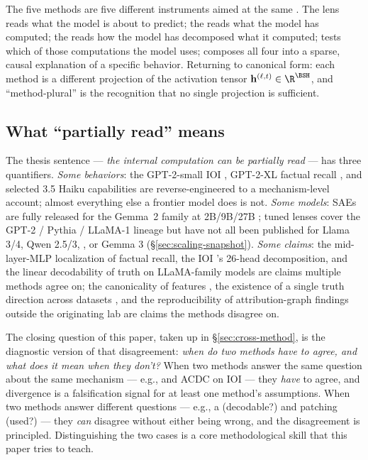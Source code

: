 \begin{intuition}
The five methods are five different instruments aimed at the same
. The lens reads what the model is about to predict;
the  reads what the model has computed; the  reads how the
model has decomposed what it computed;  tests
which of those computations the model uses; 
composes all four into a sparse, causal explanation of a specific
behavior. Returning to canonical form: each method is a different
projection of the activation tensor $\mathbf{h}^{(\ell, t)} \in
\R^{\BSH}$, and ``method-plural'' is the
recognition that no single projection is sufficient.
\end{intuition}

\subsection{What ``partially read'' means}
\label{sec:partially-read}

The thesis sentence --- \emph{the internal computation can be
partially read} --- has three quantifiers. \emph{Some behaviors}: the
GPT-2-small IOI  \citep{wang2022-ioi}, GPT-2-XL factual recall
\citep{meng2022-rome}, and selected  3.5 Haiku capabilities
\citep{lindsey2025-circuit-tracing} are reverse-engineered to a
mechanism-level account; almost everything else a frontier model does
is not. \emph{Some models}: SAEs are fully released for the Gemma~2
family at 2B/9B/27B \citep{gemma-scope-2024}; tuned lenses cover the
GPT-2 / Pythia / LLaMA-1 lineage \citep{belrose2023-tuned-lens} but
have not all been published for Llama 3/4, Qwen 2.5/3, , or
Gemma 3 (\S\ref{sec:scaling-snapshot}). \emph{Some claims}: the
mid-layer-MLP localization of factual recall, the IOI 's
26-head decomposition, and the linear decodability of truth on
LLaMA-family models are claims multiple methods agree on; the
canonicality of  features
\citep{leask2025-sae-not-canonical}, the existence of a single truth
direction across datasets \citep{marks-tegmark-2023-truth}, and the
reproducibility of attribution-graph findings outside the originating
lab are claims the methods disagree on.

The closing question of this paper, taken up in
\S\ref{sec:cross-method}, is the diagnostic version of that disagreement:
\emph{when do two methods have to agree, and what does it mean when
they don't?} When two methods answer the same question about the same
mechanism --- e.g.,  and ACDC on IOI --- they
\emph{have} to agree, and divergence is a falsification signal for at
least one method's assumptions. When two methods answer different
questions --- e.g., a  (decodable?) and patching (used?) --- they
\emph{can} disagree without either being wrong, and the disagreement
is principled. Distinguishing the two cases is a core
methodological skill that this paper tries to teach.

